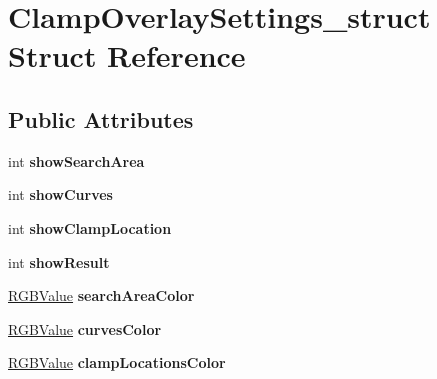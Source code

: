 \hypertarget{structClampOverlaySettings__struct}{
\section{ClampOverlaySettings\_\-struct Struct Reference}
\label{structClampOverlaySettings__struct}
}
\subsection*{Public Attributes}
\begin{DoxyCompactItemize}
\item 
\hypertarget{structClampOverlaySettings__struct_ae0417e3092e5746133be82f39661b173}{
int {\bfseries showSearchArea}}
\label{structClampOverlaySettings__struct_ae0417e3092e5746133be82f39661b173}

\item 
\hypertarget{structClampOverlaySettings__struct_a0d5e6ca284e08722bda64ce65055b792}{
int {\bfseries showCurves}}
\label{structClampOverlaySettings__struct_a0d5e6ca284e08722bda64ce65055b792}

\item 
\hypertarget{structClampOverlaySettings__struct_abff0386ffc1a74fa687b4907abe45fe7}{
int {\bfseries showClampLocation}}
\label{structClampOverlaySettings__struct_abff0386ffc1a74fa687b4907abe45fe7}

\item 
\hypertarget{structClampOverlaySettings__struct_a114e9c72f1e90851a7b275c052ccbdf1}{
int {\bfseries showResult}}
\label{structClampOverlaySettings__struct_a114e9c72f1e90851a7b275c052ccbdf1}

\item 
\hypertarget{structClampOverlaySettings__struct_af0087aada3676508961a98d24fd08ec5}{
\hyperlink{structRGBValue__struct}{RGBValue} {\bfseries searchAreaColor}}
\label{structClampOverlaySettings__struct_af0087aada3676508961a98d24fd08ec5}

\item 
\hypertarget{structClampOverlaySettings__struct_a0f8d62c52ebfb1b63dbea8cc3097e7bf}{
\hyperlink{structRGBValue__struct}{RGBValue} {\bfseries curvesColor}}
\label{structClampOverlaySettings__struct_a0f8d62c52ebfb1b63dbea8cc3097e7bf}

\item 
\hypertarget{structClampOverlaySettings__struct_ac55addeaf0ab1520eb10bc2f9e6fd9ac}{
\hyperlink{structRGBValue__struct}{RGBValue} {\bfseries clampLocationsColor}}
\label{structClampOverlaySettings__struct_ac55addeaf0ab1520eb10bc2f9e6fd9ac}


\end{DoxyCompactItemize}
